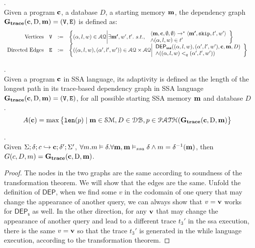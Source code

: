 \documentclass[a4paper,11pt]{article}
\begin{document}
%
%
\begin{defn}
.
\\
{
Given a program $\boldsymbol{\mathbf{c}}$, a database $D$, a starting memory $\boldsymbol{\mathbf{m}}$,
the dependency graph $\bf{G_{trace}}(\boldsymbol{\mathbf{c}},\text{D},\boldsymbol{\mathbf{m}}) = (\mathtt{V}, \mathtt{E})$ is defined as: \\
\[
\begin{array}{rlcl}
	\text{Vertices} &
	\vertxs & := & \left\{ 
	({\qval}, l,w) \in \mathcal{AQ} \middle\vert
	\exists \ssa{m'},  w', t'.  ~ s.t., ~  
	\begin{array}{l}
	\config{\ssa{m} ,\ssa{c}, \emptyset, \emptyset}  
	\to^{*}  
	\config{\ssa{m'} , \eskip, t', w' }
	\\ 
	\land ({\qval}, l, w) \in t'
	\end{array}
	\right\}
	\\
	\text{Directed Edges} &
	\edges & := & 
	\left\{ 
	(({\qval},l,w),({\qval}',l',w')) \in \mathcal{AQ} \times \mathcal{AQ} 
	\middle\vert
	\begin{array}{l}
		\mathsf{DEP_{ssa}}(({\qval},l,w), ({\qval}',l',w'),
		\ssa{c},\ssa{m},D) 
		\\ \land 
		(({\qval},l,w) <_q ({\qval}',l',w'))
	\end{array}
	\right\}
\end{array}
\]
}
\end{defn}
%
\begin{defn}
.
\\
Given a program $\boldsymbol{\mathbf{c}}$ in SSA language, 
its adaptivity is defined as the length of the longest path in its trace-based dependency graph in SSA language 
$\bf{G_{trace}}(\boldsymbol{\mathbf{c}}, \text{D},\boldsymbol{\mathbf{m}}) = (\mathtt{V}, \mathtt{E})$, 
for all possible starting SSA memory $\boldsymbol{\mathbf{m}}$ and database $D$.
%
%
$$
A(\boldsymbol{\mathbf{c}}) = \max \big 
\{ \mathtt{len}(p) \mid \boldsymbol{\mathbf{m}} \in \mathcal{SM},D \in \mathcal{DB} ,p \in \mathcal{PATH}(\bf{G_{trace}}(\boldsymbol{\mathbf{c}}, \text{D}, \boldsymbol{\mathbf{m}}) \big \} 
$$
\end{defn}
%
%
\begin{thm}.
\\
{
Given $\Sigma; \delta ; c \hookrightarrow \boldsymbol{\mathbf{c}} ; \delta';\Sigma' $,
$\forall m. m \vDash \delta. \forall \boldsymbol{\mathbf{m}}, \boldsymbol{\mathbf{m}} \vDash_{ssa} \delta \land m = \delta^{-1}(\boldsymbol{\mathbf{m}})$, 
then $G(c,D,m) = \bf{G_{trace}}(\boldsymbol{\mathbf{c}}, \text{D},\boldsymbol{\mathbf{m}}) $.
}
\end{thm}
%
\begin{proof}
 The nodes in the two graphs are the same according to soundness of the transformation theorem. We will show that the edges are the same. Unfold the definition of $\mathsf{DEP}$, when we find some $v$ in the codomain of one query that may change the appearance of another query,  we can always show that $v = \boldsymbol{\mathbf{v}}$ works for $\mathsf{DEP_s}$ as well. In the other direction, for any $\boldsymbol{\mathbf{v}}$ that may change the appearance of another query and lead to a different trace $t_3'$ in the ssa execution, there is the same $v = \boldsymbol{\mathbf{v}}$ so that the trace $t_3'$ is generated in the while language execution, according to the transformation theorem.  
\end{proof}
\end{document}
